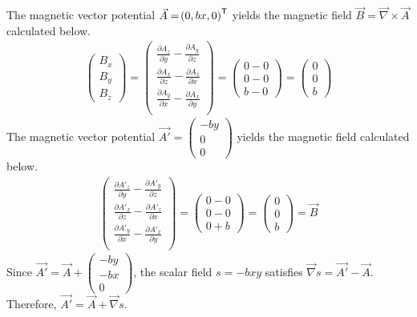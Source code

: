 \begin{answer}
	The magnetic vector potential $\vec{A} = \!\left(0, bx, 0\right)^{\mathsf{T}}$ yields the magnetic field $\vec{B} = \vec{\nabla} \times \vec{A}$ calculated below.
	\begin{align*}
		\begin{pmatrix}
			B_x \\
			B_y \\
			B_z
		\end{pmatrix}
		=
		\begin{pmatrix}
			\frac{\partial A_z}{\partial y} - \frac{\partial A_y}{\partial z} \\
			\frac{\partial A_x}{\partial z} - \frac{\partial A_z}{\partial x} \\
			\frac{\partial A_y}{\partial x} - \frac{\partial A_x}{\partial y} \\
		\end{pmatrix}
		=
		\begin{pmatrix}
			0 - 0 \\
			0 - 0 \\
			b - 0
		\end{pmatrix}
		=
		\begin{pmatrix}
			0 \\
			0 \\
			b
		\end{pmatrix}
	\end{align*}
	The magnetic vector potential $\vec{A'} = \begin{pmatrix} -b y \\ 0 \\ 0 \end{pmatrix}$ yields the magnetic field calculated below.
	\begin{align*}
		\begin{pmatrix}
			\frac{\partial A'_z}{\partial y} - \frac{\partial A'_y}{\partial z} \\
			\frac{\partial A'_x}{\partial z} - \frac{\partial A'_z}{\partial x} \\
			\frac{\partial A'_y}{\partial x} - \frac{\partial A'_x}{\partial y} \\
		\end{pmatrix}
		=
		\begin{pmatrix}
			0 - 0 \\
			0 - 0 \\
			0 + b
		\end{pmatrix}
		=
		\begin{pmatrix}
			0 \\
			0 \\
			b
		\end{pmatrix}
		= \vec{B}
	\end{align*}
	Since $\vec{A'} = \vec{A} + \begin{pmatrix} -by \\ -bx \\ 0 \end{pmatrix}$, the scalar field $s = -bxy$ satisfies $\vec{\nabla} s = \vec{A'} - \vec{A}$.
	Therefore, $\vec{A'} = \vec{A} + \vec{\nabla} s$.
\end{answer}

